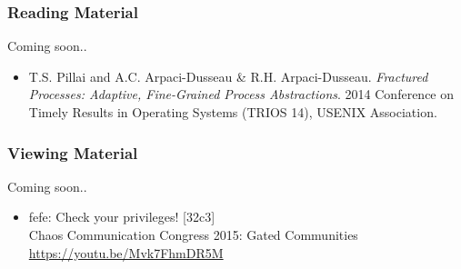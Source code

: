 \begin{frame}

\frametitle{Reading Material}

\begin{center}

Coming soon..

\end{center}

\footnotesize

\begin{itemize}

\item T.S. Pillai and A.C. Arpaci-Dusseau \& R.H. Arpaci-Dusseau.
\emph{Fractured Processes: Adaptive, Fine-Grained Process Abstractions}. 2014
Conference on Timely Results in Operating Systems (TRIOS 14), USENIX
Association.

\end{itemize}

\end{frame}


\begin{frame}

\frametitle{Viewing Material}

\begin{center}

Coming soon..

\end{center}

\footnotesize

\begin{itemize}

\item fefe: Check your privileges! [32c3] \\
Chaos Communication Congress 2015: Gated Communities \\
\hspace{0.1in} \url{https://youtu.be/Mvk7FhmDR5M}

\end{itemize}

\end{frame}

